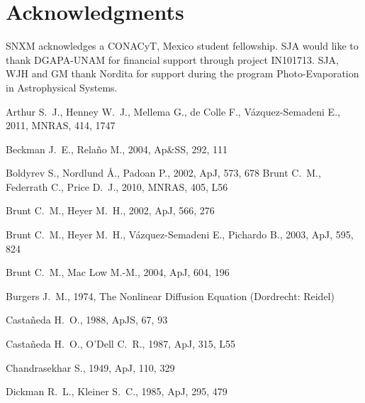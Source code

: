 \documentclass[useAMS,usenatbib]{mn2e}
\begin{document}
\section*{Acknowledgments}
SNXM acknowledges a CONACyT, Mexico student fellowship. SJA would like to thank
DGAPA-UNAM for financial support through project IN101713. SJA, WJH
and GM thank Nordita for support during the program Photo-Evaporation
in Astrophysical Systems.


\begin{thebibliography}{}
Arthur S.~J., Henney W.~J., Mellema G., de Colle F., V{\'a}zquez-Semadeni 
E., 2011, MNRAS, 414, 1747 

 Beckman J.~E., Rela{\~n}o M., 2004, Ap\&SS, 292, 111 

 Boldyrev S., Nordlund {\AA}., Padoan P., 2002, ApJ, 573, 678 
 Brunt C.~M., Federrath C., Price D.~J., 2010, MNRAS, 405, L56 

 Brunt C.~M., Heyer M.~H., 2002, ApJ, 566, 276 

Brunt C.~M., Heyer M.~H., V{\'a}zquez-Semadeni E., Pichardo B., 2003, ApJ, 
595, 824 

 Brunt C.~M., Mac Low M.-M., 2004, ApJ, 604, 196 


 Burgers
  J.~M., 1974, The Nonlinear Diffusion Equation (Dordrecht: Reidel)

Casta\~neda H.~O., 1988, ApJS, 67, 93 

 Casta\~neda H.~O., O'Dell C.~R., 1987, ApJ, 315, L55 

Chandrasekhar S., 1949, ApJ, 110, 329 

 Dickman R.~L., Kleiner S.~C., 1985, ApJ, 295, 479 


\end{thebibliography}
\end{document}
